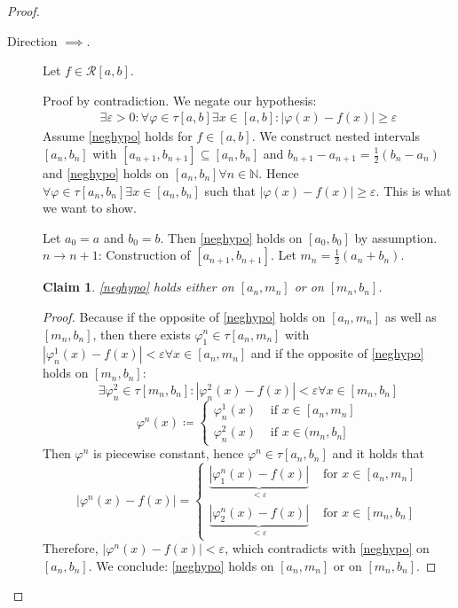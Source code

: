 \documentclass{article}
\newtheorem*{claim}{Claim}%
\newcommand{\card}[1]{\left|#1\right|}
\begin{document}
\begin{proof}\hfill{}
  \begin{description}
    \item[Direction $\implies$.] 
      Let $f \in \mathcal R[a,b]$.

      Proof by contradiction. We negate our hypothesis:
      \begin{align}
        \exists \varepsilon > 0: \forall \varphi \in \tau[a,b] \exists x \in [a,b]: \card{\varphi(x) - f(x)} \geq \varepsilon
        \label{neghypo}
      \end{align}
      Assume \eqref{neghypo} holds for $f \in [a,b]$.
      We construct nested intervals $[a_n, b_n]$ with $[a_{n+1}, b_{n+1}] \subseteq [a_n, b_n]$
      and $b_{n+1} - a_{n+1} = \frac12 (b_n - a_n)$ and \eqref{neghypo} holds on $[a_n, b_n] \forall n \in \mathbb N$.
      Hence $\forall \varphi \in \tau[a_n, b_n] \exists x \in [a_n, b_n]$ such that $\card{\varphi(x) - f(x)} \geq \varepsilon$.
      This is what we want to show.

      Let $a_0 = a$ and $b_0 = b$. Then \eqref{neghypo} holds on $[a_0, b_0]$ by assumption.
      $n \to n+1$: Construction of $[a_{n+1}, b_{n+1}]$. Let $m_n = \frac12(a_n + b_n)$.

      \begin{claim}
        \eqref{neghypo} holds either on $[a_n, m_n]$ or on $[m_n, b_n]$.
      \end{claim}

      \begin{proof}
        Because if the opposite of \eqref{neghypo} holds on $[a_n, m_n]$ as well as $[m_n, b_n]$,
        then there exists $\varphi_1^n \in \tau[a_n, m_n]$ with $\card{\varphi_n^1(x) - f(x)} < \varepsilon \forall x \in [a_n, m_n]$
        and if the opposite of \eqref{neghypo} holds on $[m_n, b_n]$:
        \[ \exists \varphi_n^2 \in \tau[m_n, b_n]: \card{\varphi_n^2(x) - f(x)} < \varepsilon \forall x \in [m_n, b_n] \]
        \[
          \varphi^n(x) \coloneqq \begin{cases}
            \varphi_n^1(x) & \text{ if } x \in [a_n, m_n] \\
            \varphi_n^2(x) & \text{ if } x \in (m_n, b_n]
          \end{cases}
        \]
        Then $\varphi^n$ is piecewise constant, hence $\varphi^n \in \tau[a_n, b_n]$ and it holds that
        \[
          \card{\varphi^n(x) - f(x)} = \begin{cases}
            \underbrace{\card{\varphi_1^n(x) - f(x)}}_{< \varepsilon}  & \text{ for } x \in [a_n, m_n] \\
            \underbrace{\card{\varphi_2^n(x) - f(x)}}_{< \varepsilon}  & \text{ for } x \in [m_n, b_n]
          \end{cases}
        \]
        Therefore, $\card{\varphi^n(x) - f(x)} < \varepsilon$, which contradicts with \eqref{neghypo} on $[a_n, b_n]$.
        We conclude: \eqref{neghypo} holds on $[a_n, m_n]$ or on $[m_n, b_n]$.
      \end{proof}


\end{description}
\end{proof}
\end{document}
